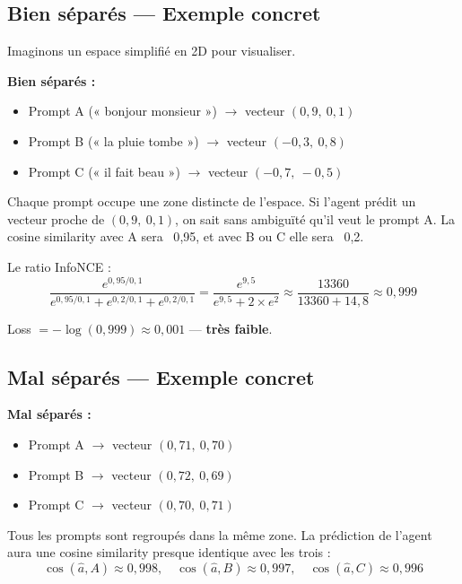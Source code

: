 \documentclass[11pt,a4paper]{article}
\begin{document}
\subsection{Bien séparés — Exemple concret}

Imaginons un espace simplifié en 2D pour visualiser.

\textbf{Bien séparés :}
\begin{itemize}
    \item Prompt A (« bonjour monsieur ») $\rightarrow$ vecteur $(0{,}9,\ 0{,}1)$
    \item Prompt B (« la pluie tombe ») $\rightarrow$ vecteur $(-0{,}3,\ 0{,}8)$
    \item Prompt C (« il fait beau ») $\rightarrow$ vecteur $(-0{,}7,\ -0{,}5)$
\end{itemize}

Chaque prompt occupe une zone distincte de l'espace. Si l'agent prédit un vecteur proche de $(0{,}9,\ 0{,}1)$, on sait sans ambiguïté qu'il veut le prompt A. La cosine similarity avec A sera ~0{,}95, et avec B ou C elle sera ~0{,}2.

Le ratio InfoNCE :
\begin{equation}
\frac{e^{0{,}95/0{,}1}}{e^{0{,}95/0{,}1} + e^{0{,}2/0{,}1} + e^{0{,}2/0{,}1}} = \frac{e^{9{,}5}}{e^{9{,}5} + 2 \times e^{2}} \approx \frac{13360}{13360 + 14{,}8} \approx 0{,}999
\end{equation}

Loss $= -\log(0{,}999) \approx 0{,}001$ — \textbf{très faible}.

\subsection{Mal séparés — Exemple concret}

\textbf{Mal séparés :}
\begin{itemize}
    \item Prompt A $\rightarrow$ vecteur $(0{,}71,\ 0{,}70)$
    \item Prompt B $\rightarrow$ vecteur $(0{,}72,\ 0{,}69)$
    \item Prompt C $\rightarrow$ vecteur $(0{,}70,\ 0{,}71)$
\end{itemize}

Tous les prompts sont regroupés dans la même zone. La prédiction de l'agent aura une cosine similarity presque identique avec les trois :
\begin{equation}
\cos(\hat{a}, A) \approx 0{,}998, \quad \cos(\hat{a}, B) \approx 0{,}997, \quad \cos(\hat{a}, C) \approx 0{,}996
\end{equation}
\end{document}
